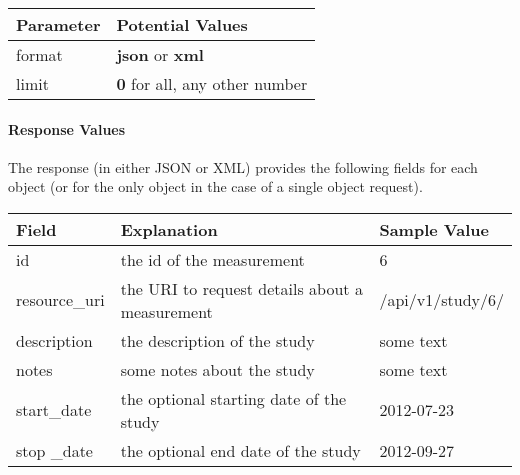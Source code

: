 \documentclass[letterpaper,10pt,english]{sphinxmanual}
\begin{document}
\begin{tabulary}{\linewidth}{|L|L|}
\hline
\textbf{
Parameter
} & \textbf{
Potential Values
}\\\hline

format
 & 
\textbf{json} or \textbf{xml}
\\\hline

limit
 & 
\textbf{0} for all, any other number
\\\hline
\end{tabulary}



\paragraph{Response Values}
\label{data:id6}
The response (in either JSON or XML) provides the following fields for each object (or for the only object in the case of a single object request).

\begin{tabulary}{\linewidth}{|L|L|L|}
\hline
\textbf{
Field
} & \textbf{
Explanation
} & \textbf{
Sample Value
}\\\hline

id
 & 
the id of the measurement
 & 
6
\\\hline

resource\_uri
 & 
the URI to request details about a measurement
 & 
/api/v1/study/6/
\\\hline

description
 & 
the description of the study
 & 
some text
\\\hline

notes
 & 
some notes about the study
 & 
some text
\\\hline

start\_date
 & 
the optional starting date of the study
 & 
2012-07-23
\\\hline

stop \_date
 & 
the optional end date of the study
 & 
2012-09-27
\\\hline
\end{tabulary}

\end{document}

